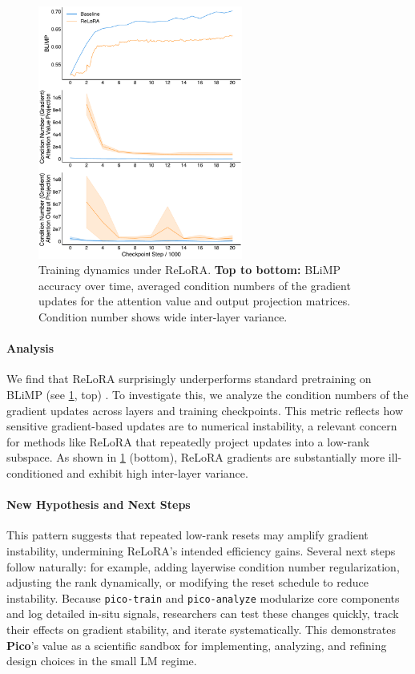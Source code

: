 \begin{figure}[h!]
    \centering
    \includegraphics[width=0.6\textwidth]{chapters/pico/figures/relora-example.pdf}
    \caption{Training dynamics under ReLoRA.
    \textbf{Top to bottom:} BLiMP accuracy over time, averaged condition numbers of the gradient updates for the attention value and output projection matrices. Condition number shows wide inter-layer variance.
    }
    \label{fig:relora_example}
\end{figure}

\paragraph{Analysis} We find that ReLoRA surprisingly underperforms standard pretraining on BLiMP (see \cref{fig:relora_example}, top) \citep{warstadt2020blimp}. To investigate this, we analyze the condition numbers of the gradient updates across layers and training checkpoints. This metric reflects how sensitive gradient-based updates are to numerical instability, a relevant concern for methods like ReLoRA that repeatedly project updates into a low-rank subspace. As shown in \cref{fig:relora_example} (bottom), ReLoRA gradients are substantially more ill-conditioned and exhibit high inter-layer variance. 


\paragraph{New Hypothesis and Next Steps}
This pattern suggests that repeated low-rank resets may amplify gradient instability, undermining ReLoRA's intended efficiency gains. Several next steps follow naturally: for example, adding layerwise condition number regularization, adjusting the rank dynamically, or modifying the reset schedule to reduce instability. Because \texttt{pico-train} and \texttt{pico-analyze} modularize core components and log detailed in-situ signals, researchers can test these changes quickly, track their effects on gradient stability, and iterate systematically. This demonstrates \textbf{Pico}'s value as a scientific sandbox for implementing, analyzing, and refining design choices in the small LM regime.


